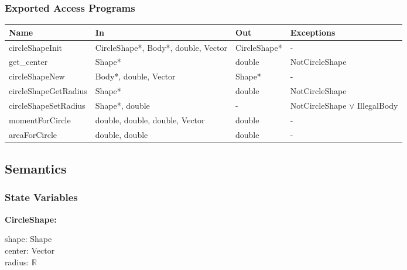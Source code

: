 \documentclass[12pt]{article}
\newcommand{\vor}{$\vee$ }
\newcommand{\R}{$\mathbb{R}$}
\begin{document}
\subsubsection{Exported Access Programs} \label{SecEAPCircle}
	\renewcommand*{\arraystretch}{1.2}
	\begin{longtable}{| y | x{3.5cm} | y | x{3.5cm} |} 
		\hline \textbf{Name} & \textbf{In} & \textbf{Out} & \textbf{Exceptions} \\ \hline 
		circleShapeInit & CircleShape*, Body*, double, Vector & CircleShape* & - \\ \hline
		get_center & Shape* & double & NotCircleShape \\ \hline
		circleShapeNew & Body*, double, Vector & Shape* & - \\ \hline
		circleShapeGetRadius & Shape* & double & NotCircleShape \\ \hline
		circleShapeSetRadius & Shape*, double & - & NotCircleShape \vor IllegalBody \\ \hline
		momentForCircle & double, double, double, Vector & double & - \\ \hline
		areaForCircle & double, double & double & - \\ \hline
	\end{longtable}

	
\subsection{Semantics}

\subsubsection{State Variables} \label{SecSVCircle}
	\textbf{CircleShape:}
	\begin{multicols}{2}
		\noindent shape: Shape \\
		center: Vector \\
		radius: \R
	\end{multicols}
	
\end{document}
